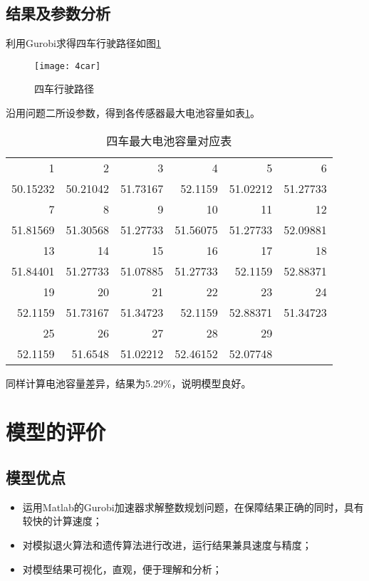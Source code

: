 \documentclass[withoutpreface,bwprint]{cumcmthesis} %
\begin{document}
\subsection{结果及参数分析}
利用Gurobi求得四车行驶路径如图\ref{fig:4car}
\begin{figure}[!h]
    \centering
    \texttt{[image: 4car]}
    \caption{四车行驶路径}
    \label{fig:4car}
\end{figure}




沿用问题二所设参数，得到各传感器最大电池容量如表\ref{tab:b2}。
\begin{table}[!h]
  \centering
  \caption{四车最大电池容量对应表}
    \begin{tabular}{rrrrrr}
    \toprule[1.5pt]
    1     & 2     & 3     & 4     & 5     & 6 \\
    50.15232 & 50.21042 & 51.73167 & 52.1159 & 51.02212 & 51.27733 \\
    7     & 8     & 9     & 10    & 11    & 12 \\
    51.81569 & 51.30568 & 51.27733 & 51.56075 & 51.27733 & 52.09881 \\
    13    & 14    & 15    & 16    & 17    & 18 \\
    51.84401 & 51.27733 & 51.07885 & 51.27733 & 52.1159 & 52.88371 \\
    19    & 20    & 21    & 22    & 23    & 24 \\
    52.1159 & 51.73167 & 51.34723 & 52.1159 & 52.88371 & 51.34723 \\
    25    & 26    & 27    & 28    & 29    &  \\
    52.1159 & 51.6548 & 51.02212 & 52.46152 & 52.07748 &  \\
    \bottomrule[1.5pt]
    \end{tabular}%
  \label{tab:b2}%
\end{table}%
同样计算电池容量差异，结果为5.29\%，说明模型良好。


\section{模型的评价}
\subsection{模型优点}
\begin{itemize}
\item 运用Matlab的Gurobi加速器求解整数规划问题，在保障结果正确的同时，具有较快的计算速度；
\item 对模拟退火算法和遗传算法进行改进，运行结果兼具速度与精度；
\item 对模型结果可视化，直观，便于理解和分析；
\end{itemize}
\end{document}
